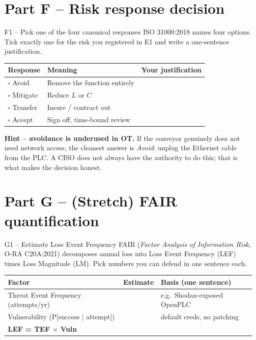 \documentclass[11pt,a4paper]{article}
\begin{document}
\section*{Part F -- Risk response decision}

\begin{stepbox}{F1 -- Pick one of the four canonical responses}
ISO 31000:2018 names four options. Tick exactly one for the risk you registered in E1 and write a one-sentence justification.

\medskip
\begin{tabular}{|p{22mm}|p{42mm}|p{82mm}|}
\hline
\textbf{Response} & \textbf{Meaning} & \textbf{Your justification} \\
\hline
$\square$ Avoid    & Remove the function entirely & \\
\hline
$\square$ Mitigate & Reduce $L$ or $C$            & \\
\hline
$\square$ Transfer & Insure / contract out        & \\
\hline
$\square$ Accept   & Sign off, time-bound review  & \\
\hline
\end{tabular}

\medskip\noindent
\textbf{Hint -- avoidance is underused in OT.} If the conveyor genuinely does not need network access, the cleanest answer is \emph{Avoid}: unplug the Ethernet cable from the PLC. A CISO does not always have the authority to do this; that is what makes the decision honest.
\end{stepbox}

\section*{Part G -- (Stretch) FAIR quantification}

\begin{stepbox}{G1 -- Estimate Loss Event Frequency}
FAIR (\emph{Factor Analysis of Information Risk}, O-RA C20A:2021) decomposes annual loss into Loss Event Frequency (LEF) times Loss Magnitude (LM). Pick numbers you can defend in one sentence each.

\medskip
\begin{tabular}{|p{60mm}|p{30mm}|p{55mm}|}
\hline
\textbf{Factor} & \textbf{Estimate} & \textbf{Basis (one sentence)} \\
\hline
Threat Event Frequency (attempts/yr) &  & e.g.\ Shodan-exposed OpenPLC \\
\hline
Vulnerability (P[success $\mid$ attempt]) &  & default creds, no patching \\
\hline
\textbf{LEF = TEF $\times$ Vuln} &  & \\
\hline
\end{tabular}
\end{stepbox}
\end{document}
